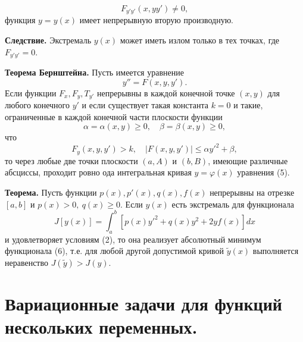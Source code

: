 \documentclass[9pt]{article}
\begin{document}
\begin{equation*}
    F_{y'y'}(x,yy')\neq0,
\end{equation*}
функция \(y=y(x)\) имеет непрерывную вторую производную.
\par\textbf{Следствие.} Экстремаль \(y(x)\) может иметь излом только в тех точках, где \(F_{y'y'}=0\).
\par\textbf{Теорема Бернштейна.} Пусть имеется уравнение
\begin{equation}
    y''=F(x,y,y').
\end{equation}
Если функции \(F_x, F_y, T_{y'}\) непрерывны в каждой конечной точке \((x,y)\) для любого конечного \(y'\) и если существует такая константа \(k=0\) и такие, ограниченные в каждой конечной части плоскости функции \[\alpha=\alpha(x,y)\ge0,\quad \beta=\beta(x,y)\ge0,\] что \[F_y(x,y,y')>k,\quad|F(x,y,y')|\le\alpha y'^2+\beta,\] то через любые две точки плоскости \((a, A)\) и \((b, B)\), имеющие различные абсциссы, проходит ровно ода интегральная кривая \(y=\varphi(x)\) уравнения (5).
\par\textbf{Теорема.} Пусть функции \(p(x), p'(x), q(x), f(x)\) непрерывны на отрезке \([a,b]\) и \(p(x)>0,\ q(x)\ge0\). Если \(y(x)\) есть экстремаль для функционала
\begin{equation}
    J[y(x)]=\int_a^b[p(x)y'^2+q(x)y^2+2yf(x)]dx
\end{equation}
и удовлетворяет условиям (2), то она реализует абсолютный минимум функционала (6), т.е. для любой другой допустимой кривой \(\tilde y(x)\) выполняется неравенство \(J(\tilde y)>J(y)\).

\section{Вариационные задачи для функций нескольких переменных.}
\end{document}
